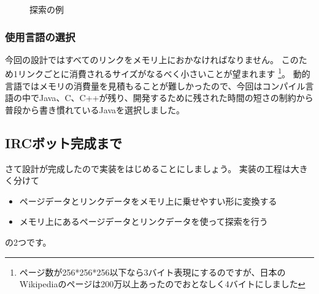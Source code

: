 \begin{figure}
  \centering
  \caption{探索の例}
\end{figure}

\subsubsection{使用言語の選択}
今回の設計ではすべてのリンクをメモリ上におかなければなりません。
このため1リンクごとに消費されるサイズがなるべく小さいことが望まれます
\footnote{ページ数が256*256*256以下なら3バイト表現にするのですが、日本のWikipediaのページは200万以上あったのでおとなしく4バイトにしました}。
動的言語ではメモリの消費量を見積もることが難しかったので、今回はコンパイル言語の中でJava、C、C++が残り、開発するために残された時間の短さの制約から普段から書き慣れているJavaを選択しました。

\subsection{IRCボット完成まで}
さて設計が完成したので実装をはじめることにしましょう。
実装の工程は大きく分けて
\begin{itemize}
\item ページデータとリンクデータをメモリ上に乗せやすい形に変換する
\item メモリ上にあるページデータとリンクデータを使って探索を行う
\end{itemize}
の2つです。


